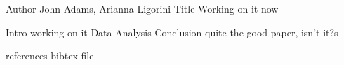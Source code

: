 Author John Adams, Arianna Ligorini 
Title Working on it now 

Intro working on it
Data
Analysis
Conclusion quite the good paper, isn't it?s


references
bibtex file
